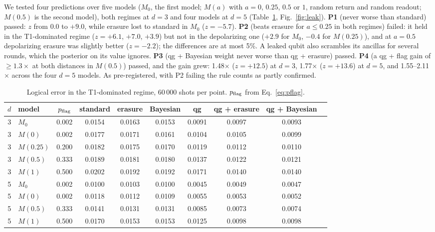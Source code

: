 \documentclass[11pt]{article}
\begin{document}
We tested four predictions over five models ($M_0$, the first model; $M(a)$ with
$a=0$, $0.25$, $0.5$ or $1$, random return and random readout; $M(0.5)$ is the second model), both
regimes at $d=3$ and four models at $d=5$ (Table~\ref{tab:bayes}, Fig.~\ref{fig:leak}).
\textbf{P1} (never worse than standard) passed: $z$ from $0.0$ to $+9.0$, while erasure lost to standard
in $M_0$ ($z=-5.7$). \textbf{P2} (beats erasure for $a\le0.25$ in both regimes) failed: it held in the
T1-dominated regime ($z=+6.1$, $+7.0$, $+3.9$) but not in the depolarizing one ($+2.9$ for $M_0$,
$-0.4$ for $M(0.25)$), and at $a=0.5$ depolarizing erasure was slightly better ($z=-2.2$); the
differences are at most 5\%. A leaked qubit also scrambles its ancillas for several rounds, which the
posterior on its value ignores. \textbf{P3} (qg + Bayesian weight never worse than qg + erasure) passed.
\textbf{P4} (a qg + flag gain of $\ge1.3\times$ at both distances in $M(0.5)$) passed, and the gain
grew: 1.48$\times$ ($z=+12.5$) at $d=3$, 1.77$\times$ ($z=+13.6$) at $d=5$, and 1.55--2.11$\times$
across the four $d=5$ models. As pre-registered, with P2 failing the rule counts as partly confirmed.

\begin{table}[t]
\centering\small
\caption{Logical error in the T1-dominated regime, 60\,000 shots per point. $p_{\rm flag}$ from
Eq.~\eqref{eq:pflag}.}
\label{tab:bayes}
\setlength{\tabcolsep}{3.4pt}
\begin{tabular}{clcccccccc}
\toprule
$d$ & model & $p_{\rm flag}$ & standard & erasure & Bayesian & qg & qg + erasure & qg + Bayesian\\
\midrule
3 & $M_0$ & 0.002 & 0.0154 & 0.0163 & 0.0153 & 0.0091 & 0.0097 & 0.0093\\
3 & $M(0)$ & 0.002 & 0.0177 & 0.0171 & 0.0161 & 0.0104 & 0.0105 & 0.0099\\
3 & $M(0.25)$ & 0.200 & 0.0182 & 0.0175 & 0.0170 & 0.0119 & 0.0112 & 0.0110\\
3 & $M(0.5)$ & 0.333 & 0.0189 & 0.0181 & 0.0180 & 0.0137 & 0.0122 & 0.0121\\
3 & $M(1)$ & 0.500 & 0.0202 & 0.0192 & 0.0192 & 0.0171 & 0.0140 & 0.0140\\
5 & $M_0$ & 0.002 & 0.0100 & 0.0103 & 0.0100 & 0.0045 & 0.0049 & 0.0047\\
5 & $M(0)$ & 0.002 & 0.0118 & 0.0112 & 0.0109 & 0.0055 & 0.0053 & 0.0052\\
5 & $M(0.5)$ & 0.333 & 0.0141 & 0.0131 & 0.0131 & 0.0085 & 0.0073 & 0.0074\\
5 & $M(1)$ & 0.500 & 0.0170 & 0.0153 & 0.0153 & 0.0125 & 0.0098 & 0.0098\\
\bottomrule
\end{tabular}
\end{table}
\end{document}
